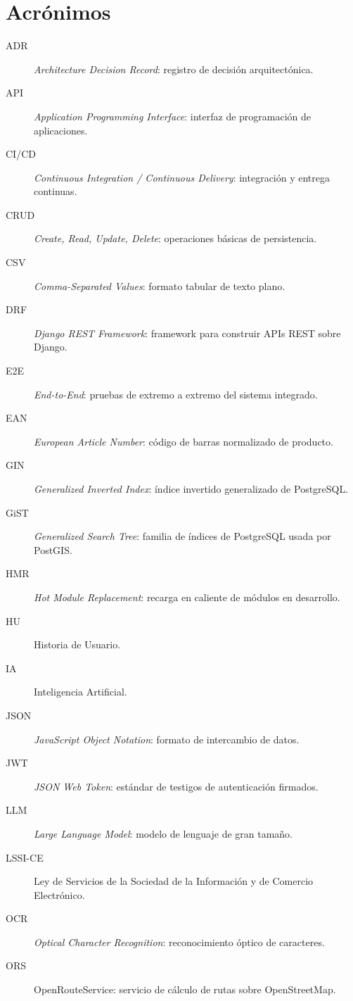 \chapter*{Acrónimos}

\begin{description}
  \item[ADR] \emph{Architecture Decision Record}: registro de decisión arquitectónica.
  \item[API] \emph{Application Programming Interface}: interfaz de programación de aplicaciones.
  \item[CI/CD] \emph{Continuous Integration / Continuous Delivery}: integración y entrega continuas.
  \item[CRUD] \emph{Create, Read, Update, Delete}: operaciones básicas de persistencia.
  \item[CSV] \emph{Comma-Separated Values}: formato tabular de texto plano.
  \item[DRF] \emph{Django REST Framework}: framework para construir APIs REST sobre Django.
  \item[E2E] \emph{End-to-End}: pruebas de extremo a extremo del sistema integrado.
  \item[EAN] \emph{European Article Number}: código de barras normalizado de producto.
  \item[GIN] \emph{Generalized Inverted Index}: índice invertido generalizado de PostgreSQL.
  \item[GiST] \emph{Generalized Search Tree}: familia de índices de PostgreSQL usada por PostGIS.
  \item[HMR] \emph{Hot Module Replacement}: recarga en caliente de módulos en desarrollo.
  \item[HU] Historia de Usuario.
  \item[IA] Inteligencia Artificial.
  \item[JSON] \emph{JavaScript Object Notation}: formato de intercambio de datos.
  \item[JWT] \emph{JSON Web Token}: estándar de testigos de autenticación firmados.
  \item[LLM] \emph{Large Language Model}: modelo de lenguaje de gran tamaño.
  \item[LSSI-CE] Ley de Servicios de la Sociedad de la Información y de Comercio Electrónico.
  \item[OCR] \emph{Optical Character Recognition}: reconocimiento óptico de caracteres.
  \item[ORS] OpenRouteService: servicio de cálculo de rutas sobre OpenStreetMap.

\end{description}
